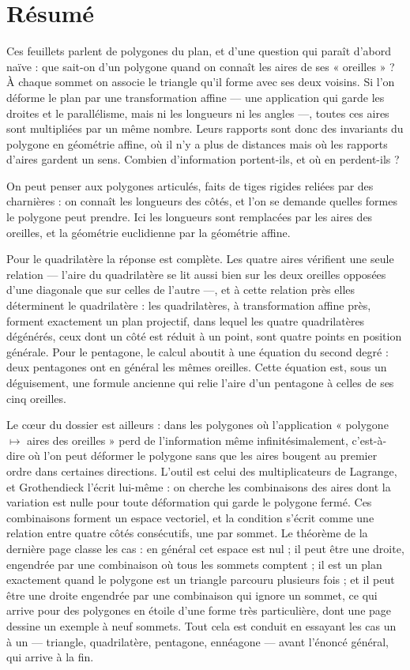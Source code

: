 \documentclass[11pt,a4paper]{article}
\begin{document}
\section*{Résumé}

\begin{resume}
Ces feuillets parlent de polygones du plan, et d'une question qui paraît
d'abord naïve : que sait-on d'un polygone quand on connaît les aires de ses
« oreilles » ? À chaque sommet on associe le triangle qu'il forme avec ses deux
voisins. Si l'on déforme le plan par une transformation affine --- une
application qui garde les droites et le parallélisme, mais ni les longueurs ni
les angles ---, toutes ces aires sont multipliées par un même nombre. Leurs
rapports sont donc des invariants du polygone en géométrie affine, où il n'y a
plus de distances mais où les rapports d'aires gardent un sens. Combien
d'information portent-ils, et où en perdent-ils ?

On peut penser aux polygones articulés, faits de tiges rigides reliées par des
charnières : on connaît les longueurs des côtés, et l'on se demande quelles
formes le polygone peut prendre. Ici les longueurs sont remplacées par les
aires des oreilles, et la géométrie euclidienne par la géométrie affine.

Pour le quadrilatère la réponse est complète. Les quatre aires vérifient une
seule relation --- l'aire du quadrilatère se lit aussi bien sur les deux
oreilles opposées d'une diagonale que sur celles de l'autre ---, et à cette
relation près elles déterminent le quadrilatère : les quadrilatères, à
transformation affine près, forment exactement un plan projectif, dans lequel
les quatre quadrilatères dégénérés, ceux dont un côté est réduit à un point,
sont quatre points en position générale. Pour le pentagone, le calcul aboutit à
une équation du second degré : deux pentagones ont en général les mêmes
oreilles. Cette équation est, sous un déguisement, une formule ancienne qui
relie l'aire d'un pentagone à celles de ses cinq oreilles.

Le cœur du dossier est ailleurs : dans les polygones où l'application
« polygone $\mapsto$ aires des oreilles » perd de l'information même
infinitésimalement, c'est-à-dire où l'on peut déformer le polygone sans que les
aires bougent au premier ordre dans certaines directions. L'outil est celui des
multiplicateurs de Lagrange, et Grothendieck l'écrit lui-même : on cherche les
combinaisons des aires dont la variation est nulle pour toute déformation qui
garde le polygone fermé. Ces combinaisons forment un espace vectoriel, et la
condition s'écrit comme une relation entre quatre côtés consécutifs, une par
sommet. Le théorème de la dernière page classe les cas : en général cet espace
est nul ; il peut être une droite, engendrée par une combinaison où tous les
sommets comptent ; il est un plan exactement quand le polygone est un triangle
parcouru plusieurs fois ; et il peut être une droite engendrée par une
combinaison qui ignore un sommet, ce qui arrive pour des polygones en étoile
d'une forme très particulière, dont une page dessine un exemple à neuf sommets.
Tout cela est conduit en essayant les cas un à un --- triangle, quadrilatère,
pentagone, ennéagone --- avant l'énoncé général, qui arrive à la fin.


\end{resume}
\end{document}
